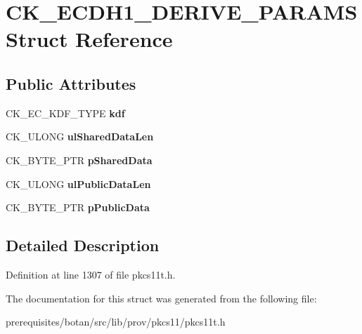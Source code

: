 \hypertarget{struct_c_k___e_c_d_h1___d_e_r_i_v_e___p_a_r_a_m_s}{}\section{C\+K\+\_\+\+E\+C\+D\+H1\+\_\+\+D\+E\+R\+I\+V\+E\+\_\+\+P\+A\+R\+A\+MS Struct Reference}
\label{struct_c_k___e_c_d_h1___d_e_r_i_v_e___p_a_r_a_m_s}
\subsection*{Public Attributes}
\begin{DoxyCompactItemize}
\item 
\mbox{\label{struct_c_k___e_c_d_h1___d_e_r_i_v_e___p_a_r_a_m_s_a41b07bdfaafe367160d98f436aab63d8}} 
C\+K\+\_\+\+E\+C\+\_\+\+K\+D\+F\+\_\+\+T\+Y\+PE {\bfseries kdf}
\item 
\mbox{\label{struct_c_k___e_c_d_h1___d_e_r_i_v_e___p_a_r_a_m_s_a02d6c1c7d1eef23185b8724d2747ed99}} 
C\+K\+\_\+\+U\+L\+O\+NG {\bfseries ul\+Shared\+Data\+Len}
\item 
\mbox{\label{struct_c_k___e_c_d_h1___d_e_r_i_v_e___p_a_r_a_m_s_add79222389080ea155a4ad9d36a3e772}} 
C\+K\+\_\+\+B\+Y\+T\+E\+\_\+\+P\+TR {\bfseries p\+Shared\+Data}
\item 
\mbox{\label{struct_c_k___e_c_d_h1___d_e_r_i_v_e___p_a_r_a_m_s_af06ac27a02189f096fd840e0e27e58c4}} 
C\+K\+\_\+\+U\+L\+O\+NG {\bfseries ul\+Public\+Data\+Len}
\item 
\mbox{\label{struct_c_k___e_c_d_h1___d_e_r_i_v_e___p_a_r_a_m_s_a73705855f1dceeed1af8180dd4f54ce0}} 
C\+K\+\_\+\+B\+Y\+T\+E\+\_\+\+P\+TR {\bfseries p\+Public\+Data}
\end{DoxyCompactItemize}


\subsection{Detailed Description}


Definition at line 1307 of file pkcs11t.\+h.



The documentation for this struct was generated from the following file\+:\begin{DoxyCompactItemize}
\item 
prerequisites/botan/src/lib/prov/pkcs11/pkcs11t.\+h\end{DoxyCompactItemize}
